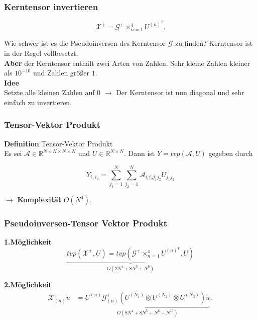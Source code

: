 \begin{frame}
\frametitle{Kerntensor invertieren}
\begin{framed}
\begin{equation*}
\pmb{\mathcal{X}}^{+} = \pmb{\mathcal{G}}^{+} \times_{n=1}^{4} U^{ (n) ^{T} }.
\end{equation*}
\end{framed}

Wie schwer ist es die Pseudoinversen des Kerntensor $\mathcal{G}$ zu finden?
Kerntensor ist in der Regel vollbesetzt. \\ \textbf{Aber} der Kerntensor enthält zwei Arten von Zahlen. Sehr kleine Zahlen kleiner als $10^{-10}$ und Zahlen größer $1$. \\
\textbf{Idee} \\
Setzte alle kleinen Zahlen auf 0 $\rightarrow$ Der Kerntensor ist nun diagonal und sehr einfach zu invertieren.

\end{frame}

\begin{frame}
\frametitle{Tensor-Vektor Produkt}
\begin{framed}
\textbf{Definition} Tensor-Vektor Produkt \\
Es sei $\mathcal{A} \in \mathbb{R}^{N \times N \times N \times N}$ und $U \in \mathbb{R}^{N \times N}$.
Dann ist $Y=tvp(\mathcal{A},U)$ gegeben durch


\begin{equation*}
Y_{i_1 \, i_2} = \sum\limits_{j_1=1}^{N} \sum\limits_{j_2=1}^{N} \mathcal{A}_{i_1 i_2 j_1 j_2} U_{j_1 j_2}
\end{equation*}

\end{framed}

$\rightarrow$ \textbf{Komplexität} $O(N^4)$.

\end{frame}

\begin{frame}
\frametitle{Pseudoinversen-Tensor Vektor Produkt}
\textbf{1.Möglichkeit}
\begin{equation*} \label{eq:pinv}
\underbrace{tvp(\mathcal{X}^{+},U) = tvp(\mathcal{G}^{+} \times_{n=1}^{4} U^{ (n) ^{T} },U)}_{O(2N^4+8N^5+N^6)}
\end{equation*} 


\textbf{2.Möglichkeit}
\begin{equation*} \label{eq:pinvcase}
\begin{aligned}
\mathcal{X}^{+}_{(n)} u&= \underbrace{U^{ (n) }  \mathcal{G}^{+}_{(n)} ( U^{ (N_{1})  } \otimes U^{ (N_{2}) }  \otimes U^{ (N_{3}) }) u}_{O(8N^4+8N^5+N^6+N^{10})} \,.
\end{aligned}
\end{equation*}

\end{frame}